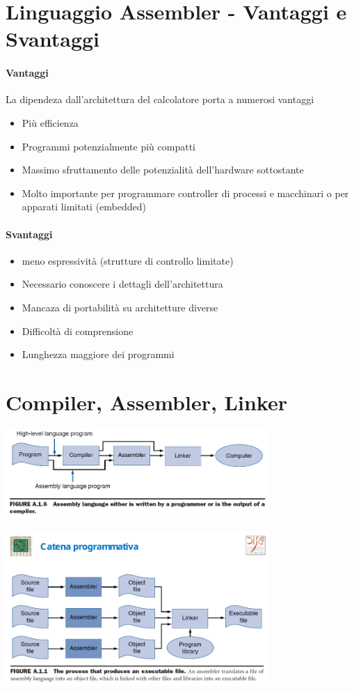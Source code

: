 \documentclass[12pt, a4paper, openany]{book}
\begin{document}
\section{Linguaggio Assembler - Vantaggi e Svantaggi}
\paragraph*{Vantaggi} La dipendeza dall'architettura del calcolatore porta a numerosi vantaggi
\begin{itemize}
    \item Più efficienza
    \item Programmi potenzialmente più compatti
    \item Massimo sfruttamento delle potenzialità dell'hardware sottostante
    \item Molto importante per programmare controller di processi e macchinari o per 
    apparati limitati (embedded)
\end{itemize}
\paragraph*{Svantaggi}
\begin{itemize}
    \item meno espressività (strutture di controllo limitate)
    \item Necessario conoscere i dettagli dell'architettura
    \item Mancaza di portabilità su architetture diverse
    \item Difficoltà di comprensione
    \item Lunghezza maggiore dei programmi
\end{itemize}

\section{Compiler, Assembler, Linker}
\begin{center}
    \includegraphics[width=100mm, scale=0.5]{compiler_assebler_linker.png}    
\end{center}
\begin{center}
    \includegraphics[width=100mm, scale=0.5]{catena programmativa.png}
\end{center}
\end{document}
